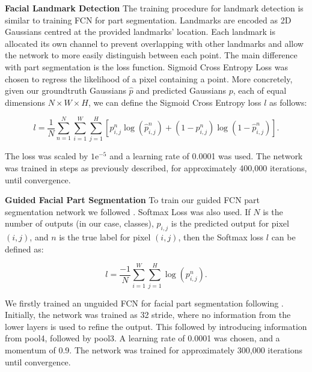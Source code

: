 \textbf{Facial Landmark Detection} The training procedure for landmark
detection is similar to training FCN for part segmentation. Landmarks
are encoded as 2D Gaussians centred at the provided landmarks'
location. Each landmark is allocated its own channel to prevent
overlapping with other landmarks and allow the network to more easily
distinguish between each point. The main difference with part
segmentation is the loss function. Sigmoid Cross Entropy Loss
\cite{zhang2015fine} was chosen to regress the likelihood of a pixel
containing a point. More concretely, given our groundtruth Gaussians
$\hat{p}$ and predicted Gaussians $p$, each of equal dimensions
$ N \times W \times H$, we can define the Sigmoid Cross Entropy loss
$l$ as follows:

\[
  l = \frac{1}{N} \sum^{N}_{n=1} \sum^{W}_{i=1} \sum^{H}_{j=1}
  [p^n_{i,j} \log(\hat{p}^n_{i,j}) + (1 -p^n_{i,j})
  \log (1-\hat{p}^n_{i,j}) ].
\]

The loss was scaled by $1\mathrm{e}^{-5}$ and a learning rate of
0.0001 was used. The network was trained in steps as previously
described, for approximately 400,000 iterations, until convergence.


\textbf{Guided Facial Part Segmentation} To train our guided FCN part
segmentation network we followed \cite{long2015fully}. Softmax Loss
was also used. If $N$ is the number of outputs (in our case, classes),
$p_{i,j}$ is the predicted output for pixel $(i,j)$, and $n$ is the
true label for pixel $(i,j)$, then the Softmax loss $l$ can be defined
as:


\[
l = \frac{-1}{N} \sum^{W}_{i=1} \sum^{H}_{j=1} \log(p^n_{i,j}).
\]

We firstly trained an unguided FCN for facial part segmentation
following \cite{long2015fully}. Initially, the network was trained as
32 stride, where no information from the lower layers is used to
refine the output. This followed by introducing information from
pool4, followed by pool3. A learning rate of 0.0001 was chosen, and a
momentum of 0.9. The network was trained for approximately 300,000
iterations until convergence.


